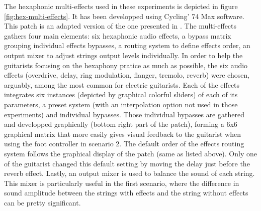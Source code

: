 \documentclass{article}
\begin{document}
The hexaphonic multi-effects used in these experiments is depicted in figure \ref{fig:hex-multi-effects}. It has been developped using Cycling' 74 Max software. This patch is an adapted version of the one presented in \cite{Reboursiere2020_Puzzle_eng}. The multi-effects gathers four main elements: six hexaphonic audio effects, a bypass matrix grouping individual effects bypasses, a routing system to define effects order, an output mixer to adjust strings  output levels individually. 
In order to help the guitarists focusing on the hexaphony pratice as much as possible, the six audio effects (overdrive, delay, ring modulation, flanger, tremolo, reverb) were chosen, arguably, among the most common for electric guitarists. Each of the effects integrates six instances (depicted by graphical colorful sliders) of each of its parameters, a preset system (with an interpolation option not used in those experiments) and individual bypasses. 
Those individual bypasses are gathered and developped graphically (bottom right part of the patch), forming a 6x6 graphical matrix that more easily gives visual feedback to the guitarist when using the foot controller in scenario 2. 
The default order of the effects routing system follows the graphical display of the patch (same as listed above). Only one of the guitarist changed this default setting by moving the delay just before the reverb effect. 
Lastly, an output mixer is used to balance the sound of each string. This mixer is particularly useful in the first scenario, where the difference in sound amplitude between the strings with effects and the string without effects can be pretty significant.
\end{document}
